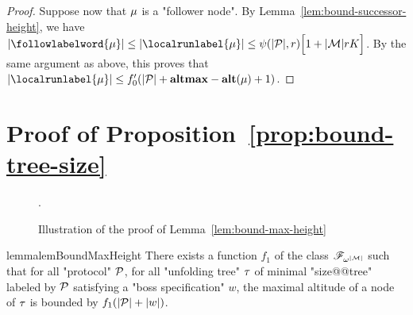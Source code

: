 \begin{proof}
	Suppose now that $\mu$ is a "follower node". By Lemma~\ref{lem:bound-successor-height}, we have 
	$\size{\followlabelword{\node}} \leq \size{\localrunlabel{\node}} \leq \towerfun(\size{\prot},r) \Big[1+\size{\messages}rK\Big]$.
	By the same argument as above, this proves that $\size{\localrunlabel{\node}} \leq f_0'(\size{\prot} + \altmax - \altitude{\node}+1)$.
\end{proof}



\section{Proof of Proposition~\ref{prop:bound-tree-size}}
\label{app:bound-tree-size}

\begin{figure}[h]
	
	\caption{Illustration of the proof of Lemma~\ref{lem:bound-max-height}}.
	\label{fig:max-height-bound}
\end{figure}
\begin{restatable}{lemma}{lemBoundMaxHeight}
	\label{lem:bound-max-height}
	There exists a function $f_1$ of the class $\mathscr{F}_{\omega^{|\mathcal{M}|}}$ such that for all "protocol" $\mathcal{P}$, for all "unfolding tree" $\tau$ of minimal "size@@tree" labeled by $\mathcal{P}$ satisfying a "boss specification" $w$, the maximal altitude of a node of $\tau$ is bounded by $f_1(|\mathcal{P}| + |w|)$.
\end{restatable}
